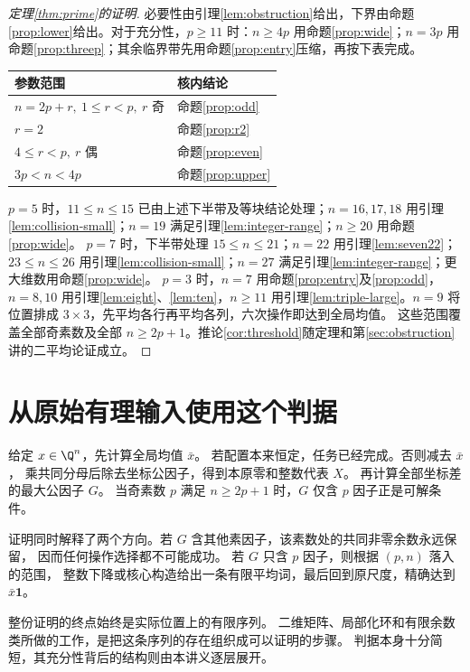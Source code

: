 \begin{proof}[定理\ref{thm:prime}的证明]
必要性由引理\ref{lem:obstruction}给出，下界由命题\ref{prop:lower}给出。对于充分性，$p\ge11$ 时：$n\ge4p$ 用命题\ref{prop:wide}；$n=3p$ 用命题\ref{prop:threep}；其余临界带先用命题\ref{prop:entry}压缩，再按下表完成。
\begin{center}
\begin{tabular}{ll}
\toprule 参数范围 & 核内结论\\\midrule
$n=2p+r,\ 1\le r<p,\ r$ 奇 & 命题\ref{prop:odd}\\
$r=2$ & 命题\ref{prop:r2}\\
$4\le r<p,\ r$ 偶 & 命题\ref{prop:even}\\
$3p<n<4p$ & 命题\ref{prop:upper}\\\bottomrule
\end{tabular}
\end{center}
$p=5$ 时，$11\le n\le15$ 已由上述下半带及等块结论处理；$n=16,17,18$ 用引理\ref{lem:collision-small}；$n=19$ 满足引理\ref{lem:integer-range}；$n\ge20$ 用命题\ref{prop:wide}。
$p=7$ 时，下半带处理 $15\le n\le21$；$n=22$ 用引理\ref{lem:seven22}；$23\le n\le26$ 用引理\ref{lem:collision-small}；$n=27$ 满足引理\ref{lem:integer-range}；更大维数用命题\ref{prop:wide}。
$p=3$ 时，$n=7$ 用命题\ref{prop:entry}及\ref{prop:odd}，$n=8,10$ 用引理\ref{lem:eight}、\ref{lem:ten}，$n\ge11$ 用引理\ref{lem:triple-large}。$n=9$ 将位置排成 $3\times3$，先平均各行再平均各列，六次操作即达到全局均值。
这些范围覆盖全部奇素数及全部 $n\ge2p+1$。推论\ref{cor:threshold}随定理和第\ref{sec:obstruction}讲的二平均论证成立。
\end{proof}

\section{从原始有理输入使用这个判据}
给定 $x\in\Q^n$，先计算全局均值 $\bar x$。
若配置本来恒定，任务已经完成。否则减去 $\bar x$，
乘共同分母后除去坐标公因子，得到本原零和整数代表 $X$。
再计算全部坐标差的最大公因子 $G$。
当奇素数 $p$ 满足 $n\ge2p+1$ 时，$G$ 仅含 $p$ 因子正是可解条件。

证明同时解释了两个方向。若 $G$ 含其他素因子，该素数处的共同非零余数永远保留，
因而任何操作选择都不可能成功。
若 $G$ 只含 $p$ 因子，则根据 $(p,n)$ 落入的范围，
整数下降或核心构造给出一条有限平均词，最后回到原尺度，精确达到 $\bar x\mathbf1$。

整份证明的终点始终是实际位置上的有限序列。
二维矩阵、局部化环和有限余数类所做的工作，是把这条序列的存在组织成可以证明的步骤。
判据本身十分简短，其充分性背后的结构则由本讲义逐层展开。


